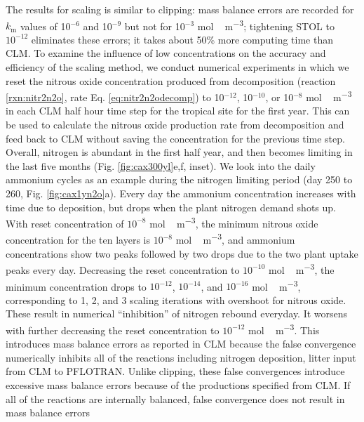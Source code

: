 \documentclass[gmd, manuscript]{copernicus}
\begin{document}
The results for scaling is similar to clipping: mass balance errors are
recorded for $k_\text{m}$ values of 10$^{-6}$ and 10$^{-9}$ but not for
10$^{-3}$ \unit{mol\,m^{-3}};  tightening STOL to $10^{-12}$ eliminates these
errors; it takes about 50\% more computing time than CLM. To examine the
influence of low concentrations on the accuracy and efficiency of the scaling
method, we conduct numerical experiments in which we reset the nitrous oxide
concentration  produced from decomposition (reaction \ref{rxn:nitr2n2o}, rate
Eq. \ref{eq:nitr2n2odecomp}) to 10$^{-12}$, 10$^{-10}$, or 10$^{-8}$
\unit{mol\,m^{-3}} in each CLM half hour time step for the tropical site for
the first year. This can be used to calculate the nitrous oxide production rate
from decomposition and feed back to CLM without saving the concentration for
the previous time step. Overall, nitrogen is abundant in the first half year,
and then becomes limiting in the last five months (Fig. \ref{fig:cax300yl}e,f,
inset). We look into the daily ammonium cycles as an example during the
nitrogen limiting period (day 250 to 260, Fig. \ref{fig:cax1yn2o}a). Every day
the ammonium concentration increases with time due to deposition, but drops
when the plant nitrogen demand shots up. With reset concentration of $10^{-8}$
\unit{mol\,m^{-3}}, the minimum nitrous oxide concentration for the ten layers
is $10^{-8}$ \unit{mol\,m^{-3}}, and ammonium concentrations show two peaks
followed by two drops due to the two  plant uptake peaks every day. Decreasing
the reset concentration to $10^{-10}$ \unit{mol\,m^{-3}}, the minimum
concentration drops to $10^{-12}$,  $10^{-14}$, and  $10^{-16}$
\unit{mol\,m^{-3}}, corresponding to 1, 2, and 3 scaling iterations with
overshoot for nitrous oxide. These result in numerical ``inhibition'' of nitrogen rebound
everyday. It worsens with further decreasing the reset concentration to
$10^{-12}$ \unit{mol\,m^{-3}}. This introduces mass balance errors as reported
in CLM because the false convergence numerically inhibits all of the reactions
including nitrogen deposition, litter input from CLM to PFLOTRAN.  Unlike
clipping, these false convergences introduce excessive mass balance errors
because of the productions specified from CLM. If all of the reactions are
internally balanced, false convergence does not result in mass balance errors
\end{document}
